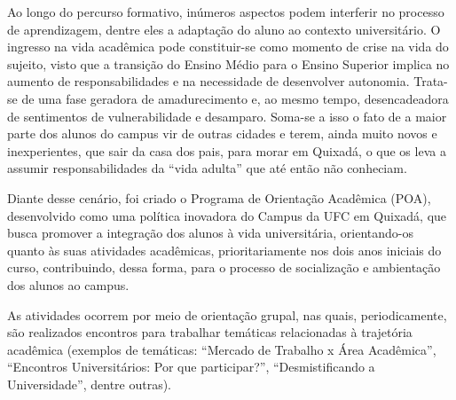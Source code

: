 Ao longo do percurso formativo, inúmeros aspectos podem interferir no processo de aprendizagem, dentre eles a adaptação do aluno ao contexto universitário. O ingresso na vida acadêmica pode constituir-se como momento de crise na vida do sujeito, visto que a transição do Ensino Médio para o Ensino Superior implica no aumento de responsabilidades e na necessidade de desenvolver autonomia. Trata-se de uma fase geradora de amadurecimento e, ao mesmo tempo, desencadeadora de sentimentos de vulnerabilidade e desamparo. Soma-se a isso o fato de a maior parte dos alunos do campus vir de outras cidades e terem, ainda muito novos e inexperientes, que sair da casa dos pais, para morar em Quixadá, o que os leva a assumir responsabilidades da “vida adulta” que até então não conheciam.

Diante desse cenário, foi criado o Programa de Orientação Acadêmica (POA), desenvolvido como uma política inovadora do Campus da UFC em Quixadá, que busca promover a integração dos alunos à vida universitária, orientando-os quanto às suas atividades acadêmicas, prioritariamente nos dois anos iniciais do curso, contribuindo, dessa forma, para o processo de socialização e ambientação dos alunos ao campus.


As atividades ocorrem por meio de orientação grupal, nas quais, periodicamente, são realizados encontros para trabalhar temáticas relacionadas à trajetória acadêmica (exemplos de temáticas: “Mercado de Trabalho x Área Acadêmica”, “Encontros Universitários: Por que participar?”, “Desmistificando a Universidade”, dentre outras).


